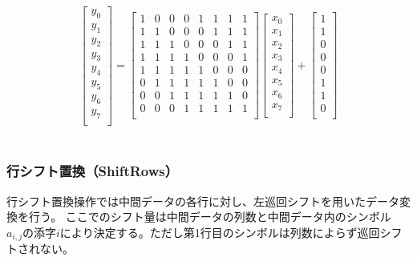 \documentclass[dvipdfmx,autodetect-engine,titlepage]{jsarticle}
\begin{document}
\begin{eqnarray}
  \begin{bmatrix}
    y_{0}\\
    y_{1}\\
    y_{2}\\
    y_{3}\\
    y_{4}\\
    y_{5}\\
    y_{6}\\
    y_{7}\\
  \end{bmatrix}
  =   
  \begin{bmatrix}
    1 & 0 & 0 & 0 & 1 & 1 & 1 & 1\\
    1 & 1 & 0 & 0 & 0 & 1 & 1 & 1\\
    1 & 1 & 1 & 0 & 0 & 0 & 1 & 1\\
    1 & 1 & 1 & 1 & 0 & 0 & 0 & 1\\
    1 & 1 & 1 & 1 & 1 & 0 & 0 & 0\\
    0 & 1 & 1 & 1 & 1 & 1 & 0 & 0\\
    0 & 0 & 1 & 1 & 1 & 1 & 1 & 0\\
    0 & 0 & 0 & 1 & 1 & 1 & 1 & 1\\
  \end{bmatrix}  
  \begin{bmatrix}
    x_{0}\\
    x_{1}\\
    x_{2}\\
    x_{3}\\
    x_{4}\\
    x_{5}\\
    x_{6}\\
    x_{7}\\
  \end{bmatrix}
  +
  \begin{bmatrix}
    1\\
    1\\
    0\\
    0\\
    0\\
    1\\
    1\\
    0\\
  \end{bmatrix}
\end{eqnarray}
　
\subsubsection{行シフト置換（ShiftRows）}
行シフト置換操作では中間データの各行に対し、左巡回シフトを用いたデータ変換を行う。
ここでのシフト量は中間データの列数と中間データ内のシンボル\begin{math}
  a_{i,j}の添字iにより決定する。
\end{math}ただし第1行目のシンボルは列数によらず巡回シフトされない。\\
\end{document}
